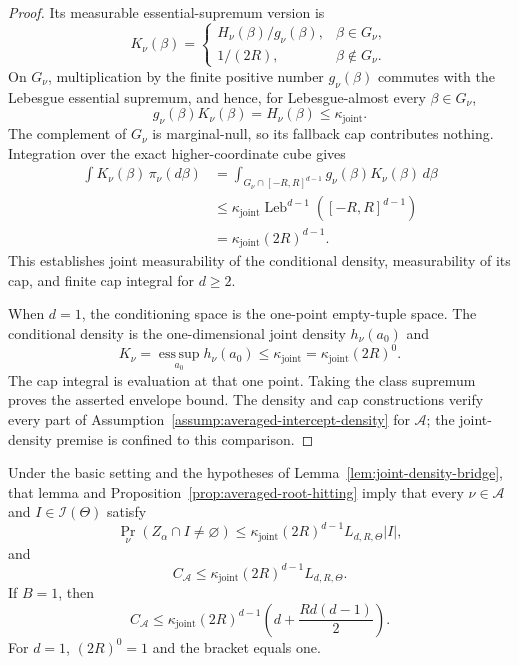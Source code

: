 \begin{proof}
Its measurable essential-supremum version is
\[
K_\nu(\beta)=
\begin{cases}
H_\nu(\beta)/g_\nu(\beta),&\beta\in G_\nu,\\[4pt]
1/(2R),&\beta\notin G_\nu.
\end{cases}
\]
On $G_\nu$, multiplication by the finite positive number
$g_\nu(\beta)$ commutes with the Lebesgue essential supremum, and hence,
for Lebesgue-almost every $\beta\in G_\nu$,
\[
g_\nu(\beta)K_\nu(\beta)
=H_\nu(\beta)
\leq\kappa_{\mathrm{joint}}.
\]
The complement of $G_\nu$ is marginal-null, so its fallback cap
contributes nothing.  Integration over the exact higher-coordinate cube
gives
\[
\begin{aligned}
\int K_\nu(\beta)\,\pi_\nu(d\beta)
&=\int_{G_\nu\cap[-R,R]^{d-1}}
  g_\nu(\beta)K_\nu(\beta)\,d\beta\\
&\leq\kappa_{\mathrm{joint}}
  \operatorname{Leb}^{d-1}([-R,R]^{d-1})\\
&=\kappa_{\mathrm{joint}}(2R)^{d-1}.
\end{aligned}
\]
This establishes joint measurability of the conditional density,
measurability of its cap, and finite cap integral for $d\geq2$.

When $d=1$, the conditioning space is the one-point empty-tuple space.
The conditional density is the one-dimensional joint density
$h_\nu(a_0)$ and
\[
K_\nu
=\operatorname*{ess\,sup}_{a_0}h_\nu(a_0)
\leq\kappa_{\mathrm{joint}}
=\kappa_{\mathrm{joint}}(2R)^0.
\]
The cap integral is evaluation at that one point.  Taking the class
supremum proves the asserted envelope bound.  The density and cap
constructions verify every part of
Assumption~\ref{assump:averaged-intercept-density} for $\mathcal A$;
the joint-density premise is confined to this comparison.
\end{proof}

\begin{proposition}
\label{prop:joint-density-baseline}
Under the basic setting and the hypotheses of
Lemma~\ref{lem:joint-density-bridge}, that lemma and
Proposition~\ref{prop:averaged-root-hitting} imply that every
$\nu\in\mathcal A$ and $I\in\mathscr I(\Theta)$ satisfy
\[
\Pr_\nu(Z_\alpha\cap I\neq\varnothing)
\leq\kappa_{\mathrm{joint}}(2R)^{d-1}
      L_{d,R,\Theta}|I|,
\]
and
\[
C_{\mathcal A}
\leq\kappa_{\mathrm{joint}}(2R)^{d-1}L_{d,R,\Theta}.
\]
If $B=1$, then
\[
C_{\mathcal A}
\leq\kappa_{\mathrm{joint}}(2R)^{d-1}
\left(d+\frac{Rd(d-1)}2\right).
\]
For $d=1$, $(2R)^0=1$ and the bracket equals one.
\end{proposition}

